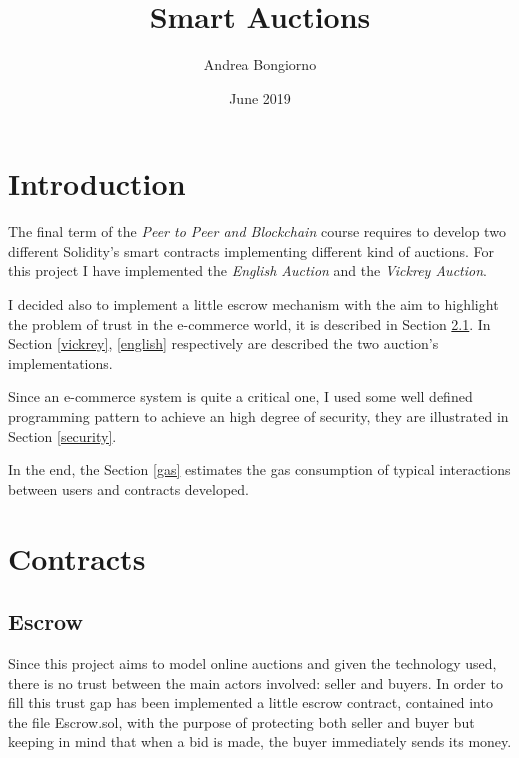 \documentclass{article}
\title{Smart Auctions}
\author{Andrea Bongiorno}
\date{June 2019}
\begin{document}
\maketitle
\newpage
\tableofcontents
\newpage
\section{Introduction}
The final term of the \textit{Peer to Peer and Blockchain} course requires to develop two different Solidity's smart contracts implementing different kind of auctions. For this project I have implemented the \textit{English Auction} and the \textit{Vickrey Auction}.

I decided also to implement a little escrow mechanism with the aim to highlight the problem of trust in the e-commerce world, it is described in Section \ref{escrow}. In Section \ref{vickrey}, \ref{english} respectively are described the two auction's implementations.

Since an e-commerce system is quite a critical one, I used some well defined programming pattern to achieve an high degree of security, they are illustrated in Section \ref{security}.

In the end, the Section \ref{gas} estimates the gas consumption of typical interactions between users and contracts developed.  
\section{Contracts}
\subsection{Escrow}\label{escrow}
Since this project aims to model online auctions and given the technology used, there is no trust between the main actors involved: seller and buyers.
In order to fill this trust gap has been implemented a little escrow contract, contained into the file Escrow.sol, with the purpose of protecting both seller and buyer but keeping in mind that when a bid is made, the buyer immediately sends its money.
\end{document}
